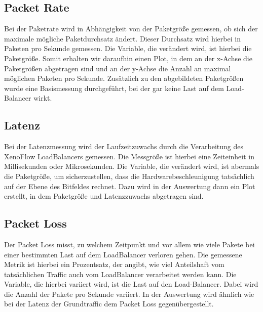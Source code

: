 \subsection{Packet Rate}
Bei der Paketrate wird in Abhängigkeit von der Paketgröße gemessen, ob sich der maximale mögliche Paketdurchsatz ändert. Dieser Durchsatz wird hierbei in Paketen pro Sekunde gemessen. Die Variable, die verändert wird, ist hierbei die Paketgröße. Somit erhalten wir daraufhin einen Plot, in dem an der x-Achse die Paketgrößen abgetragen sind und an der y-Achse die Anzahl an maximal möglichen Paketen pro Sekunde. Zusätzlich zu den abgebildeten Paketgrößen wurde eine Basismessung durchgeführt, bei der gar keine Last auf dem Load-Balancer wirkt.
\subsection{Latenz}
Bei der Latenzmessung wird der Laufzeitzuwachs durch die Verarbeitung des XenoFlow LoadBalancers gemessen. Die Messgröße ist hierbei eine Zeiteinheit in Millisekunden oder Mikrosekunden. Die Variable, die verändert wird, ist abermals die Paketgröße, um sicherzustellen, dass die Hardwarebeschleunigung tatsächlich auf der Ebene des Bitfeldes rechnet. Dazu wird in der Auswertung dann ein Plot erstellt, in dem Paketgröße und Latenzzuwachs abgetragen sind.
\subsection{Packet Loss}
Der Packet Loss misst, zu welchem Zeitpunkt und vor allem wie viele Pakete bei einer bestimmten Last auf dem LoadBalancer verloren gehen. Die gemessene Metrik ist hierbei ein Prozentsatz, der angibt, wie viel Anteilshaft vom tatsächlichen Traffic auch vom LoadBalancer verarbeitet werden kann. Die Variable, die hierbei variiert wird, ist die Last auf den Load-Balancer. Dabei wird die Anzahl der Pakete pro Sekunde variiert. In der Auswertung wird ähnlich wie bei der Latenz der Grundtraffic dem Packet Loss gegenübergestellt.
